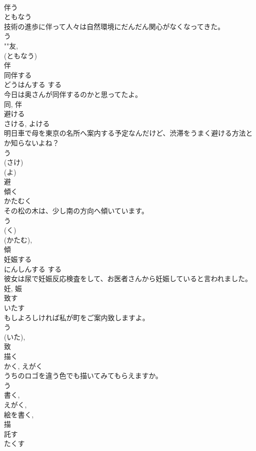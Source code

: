 \documentclass[8pt]{extreport}
\begin{document}
\begin{CJK}{UTF8}{min}
\\	伴う	
\\	ともなう	
\\	技術の進歩に伴って人々は自然環境にだんだん関心がなくなってきた。	
\\	う 
\\	""友, 
\\	(ともなう) 
\\	伴	
\\	同伴する	
\\	どうはんする	する 
\\	今日は奥さんが同伴するのかと思ってたよ。	
\\	同, 伴	
\\	避ける	
\\	さける, よける	
\\	明日車で母を東京の名所へ案内する予定なんだけど、渋滞をうまく避ける方法とか知らないよね？	
\\	う 
\\	(さけ) 
\\	(よ) 
\\	避	
\\	傾く	
\\	かたむく	
\\	その松の木は、少し南の方向へ傾いています。	
\\	う 
\\	(く) 
\\	(かたむ), 
\\	傾	
\\	妊娠する	
\\	にんしんする	する 
\\	彼女は尿で妊娠反応検査をして、お医者さんから妊娠していると言われました。	
\\	妊, 娠	
\\	致す	
\\	いたす	
\\	もしよろしければ私が町をご案内致しますよ。	
\\	う 
\\	(いた), 
\\	致	
\\	描く	
\\	かく, えがく	
\\	うちのロゴを違う色でも描いてみてもらえますか。	
\\	う 
\\	書く, 
\\	えがく, 
\\	絵を書く, 
\\	描	
\\	託す	
\\	たくす	

\end{CJK}
\end{document}
